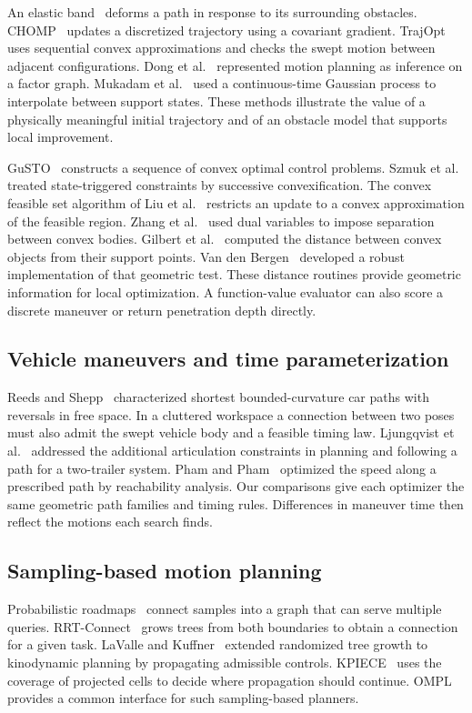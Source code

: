 \documentclass[a4paper]{cas-sc}
\begin{document}
An elastic band~\cite{elastic} deforms a path in response to its surrounding obstacles. CHOMP~\cite{chomp} updates a discretized trajectory using a covariant gradient. TrajOpt~\cite{trajopt} uses sequential convex approximations and checks the swept motion between adjacent configurations. Dong et al.~\cite{inference} represented motion planning as inference on a factor graph. Mukadam et al.~\cite{gpmp} used a continuous-time Gaussian process to interpolate between support states. These methods illustrate the value of a physically meaningful initial trajectory and of an obstacle model that supports local improvement.

GuSTO~\cite{gusto} constructs a sequence of convex optimal control problems. Szmuk et al.~\cite{scp} treated state-triggered constraints by successive convexification. The convex feasible set algorithm of Liu et al.~\cite{cfs} restricts an update to a convex approximation of the feasible region. Zhang et al.~\cite{obca} used dual variables to impose separation between convex bodies. Gilbert et al.~\cite{rigid} computed the distance between convex objects from their support points. Van den Bergen~\cite{gk} developed a robust implementation of that geometric test. These distance routines provide geometric information for local optimization. A function-value evaluator can also score a discrete maneuver or return penetration depth directly.

\subsection{Vehicle maneuvers and time parameterization}
Reeds and Shepp~\cite{reeds} characterized shortest bounded-curvature car paths with reversals in free space. In a cluttered workspace a connection between two poses must also admit the swept vehicle body and a feasible timing law. Ljungqvist et al.~\cite{tractor} addressed the additional articulation constraints in planning and following a path for a two-trailer system. Pham and Pham~\cite{topp} optimized the speed along a prescribed path by reachability analysis. Our comparisons give each optimizer the same geometric path families and timing rules. Differences in maneuver time then reflect the motions each search finds.

\subsection{Sampling-based motion planning}
Probabilistic roadmaps~\cite{prm} connect samples into a graph that can serve multiple queries. RRT-Connect~\cite{connect} grows trees from both boundaries to obtain a connection for a given task. LaValle and Kuffner~\cite{kino2} extended randomized tree growth to kinodynamic planning by propagating admissible controls. KPIECE~\cite{kpiece} uses the coverage of projected cells to decide where propagation should continue. OMPL~\cite{ompl} provides a common interface for such sampling-based planners.
\end{document}
